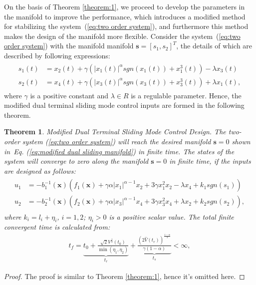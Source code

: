 \documentclass[3p]{elsarticle}
\theoremstyle{plain}
\newtheorem{mythm}{Theorem}
\theoremstyle{remark}
\begin{document}
On the basis of Theorem \ref{theorem:1}, we proceed to develop the parameters in the manifold to improve the performance, which introduces a modified method for stabilizing the system~(\ref{eq:two order system}), and furthermore this method makes the design of the manifold more flexible. Consider the system~(\ref{eq:two order system}) with the manifold manifold $\bm s = [s_1,s_2]^T$, the details of which are described by following expressions:
\begin{align}
\begin{split}
s_1(t) &= x_2(t)+\gamma(\vert x_1(t)\vert^{\alpha} sgn(x_1(t))+x_1^3(t))-\lambda x_3(t)\\
s_2(t) &= x_4(t)+\gamma(\vert x_3(t)\vert^{\alpha} sgn(x_3(t))+x_3^3(t))+\lambda x_1(t),\label{eq:modified dual sliding manifold}
\end{split}
\end{align}
where $\gamma$ is a positive constant and $\lambda\in R$ is a regulable parameter. Hence, the modified dual terminal sliding mode control inputs are formed in the following theorem.
\begin{mythm}\label{theorem:2}Modified Dual Terminal Sliding Mode Control Design.
The two-order system (\ref{eq:two order system}) will reach the desired manifold $\bm s = 0$ shown in~Eq. (\ref{eq:modified dual sliding manifold}) in finite time. The states of the system will converge to zero along the manifold $\bm s=0$ in finite time, if the inputs are designed as follows:
\begin{align}
\begin{split}
u_1 &= -b_1^{-1}(\bm x)(f_1(\bm x)+\gamma\alpha\vert x_1\vert^{\alpha-1}x_2+3\gamma x_1^2x_2-\lambda x_4+k_1sgn(s_1))\\
u_2 &= -b_2^{-1}(\bm x)(f_2(\bm x)+\gamma\alpha\vert x_3\vert^{\alpha-1}x_4+3\gamma x_3^2x_4+\lambda x_2+k_2sgn(s_2)),\label{eq:modified input}
\end{split}
\end{align}
where $k_i = l_i+\eta_i$, $i=1,2$; $\eta_i>0$ is a positive scalar value. The total finite convergent time is calculated from:
\begin{align}
t_f = \underbrace{t_0+\frac{\sqrt{2}V^{\frac{1}{2}}(t_0)}{\min(\eta_1,\eta_2)}}_{t_r}+\underbrace{\frac{(2\hat V(t_r))^{\frac{1-\alpha}{2}}}{\gamma(1-\alpha)}}_{t_s}<\infty,\label{eq:total convergent time}
\end{align}
\end{mythm}
\begin{proof}
The proof is similar to Theorem \ref{theorem:1}, hence it's omitted here.
\end{proof}
\end{document}
